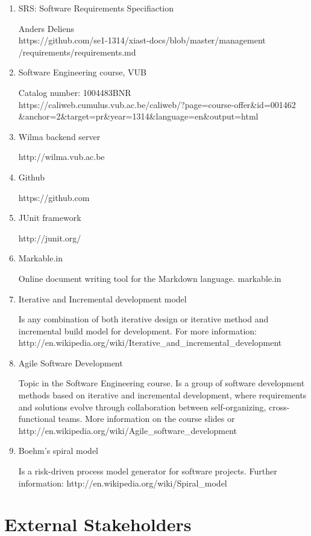 \documentclass[12pt]{article}
\begin{document}
\begin{enumerate}
\def\labelenumi{\arabic{enumi}.}
\item
  SRS: Software Requirements Specifiaction

  Anders Deliens\\
  https://github.com/se1-1314/xiast-docs/blob/master/management\\
  /requirements/requirements.md
\item
  Software Engineering course, VUB

  Catalog number: 1004483BNR\\
  https://caliweb.cumulus.vub.ac.be/caliweb/?page=course-offer\&id=001462\\
  \&anchor=2\&target=pr\&year=1314\&language=en\&output=html
\item
  Wilma backend server

  http://wilma.vub.ac.be
\item
  Github

  https://github.com
\item
  JUnit framework

  http://junit.org/
\item
  Markable.in

  Online document writing tool for the Markdown language.
  markable.in
\item
  Iterative and Incremental development model

  Is any combination of both iterative design or iterative method and
  incremental build model for development. For more information:\\
  http://en.wikipedia.org/wiki/Iterative\_and\_incremental\_development
\item
  Agile Software Development

  Topic in the Software Engineering course. Is a group of software
  development methods based on iterative
  and incremental development, where requirements and solutions evolve
  through collaboration between self-organizing, cross-functional teams.
  More information on the course slides or
  http://en.wikipedia.org/wiki/Agile\_software\_development
\item
  Boehm's spiral model

  Is a risk-driven process model generator for software projects.
  Further information: http://en.wikipedia.org/wiki/Spiral\_model
\end{enumerate}

\section{External Stakeholders}\label{external-stakeholders}
\end{document}
